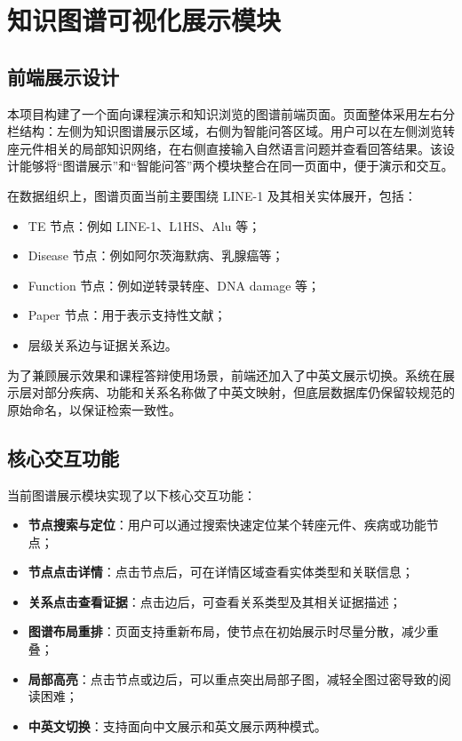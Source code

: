 \section{知识图谱可视化展示模块}

\subsection{前端展示设计}

本项目构建了一个面向课程演示和知识浏览的图谱前端页面。页面整体采用左右分栏结构：左侧为知识图谱展示区域，右侧为智能问答区域。用户可以在左侧浏览转座元件相关的局部知识网络，在右侧直接输入自然语言问题并查看回答结果。该设计能够将“图谱展示”和“智能问答”两个模块整合在同一页面中，便于演示和交互。

在数据组织上，图谱页面当前主要围绕 LINE-1 及其相关实体展开，包括：

\begin{itemize}[leftmargin=2em]
  \item TE 节点：例如 LINE-1、L1HS、Alu 等；
  \item Disease 节点：例如阿尔茨海默病、乳腺癌等；
  \item Function 节点：例如逆转录转座、DNA damage 等；
  \item Paper 节点：用于表示支持性文献；
  \item 层级关系边与证据关系边。
\end{itemize}

为了兼顾展示效果和课程答辩使用场景，前端还加入了中英文展示切换。系统在展示层对部分疾病、功能和关系名称做了中英文映射，但底层数据库仍保留较规范的原始命名，以保证检索一致性。

\subsection{核心交互功能}

当前图谱展示模块实现了以下核心交互功能：

\begin{itemize}[leftmargin=2em]
  \item \textbf{节点搜索与定位}：用户可以通过搜索快速定位某个转座元件、疾病或功能节点；
  \item \textbf{节点点击详情}：点击节点后，可在详情区域查看实体类型和关联信息；
  \item \textbf{关系点击查看证据}：点击边后，可查看关系类型及其相关证据描述；
  \item \textbf{图谱布局重排}：页面支持重新布局，使节点在初始展示时尽量分散，减少重叠；
  \item \textbf{局部高亮}：点击节点或边后，可以重点突出局部子图，减轻全图过密导致的阅读困难；
  \item \textbf{中英文切换}：支持面向中文展示和英文展示两种模式。
\end{itemize}

